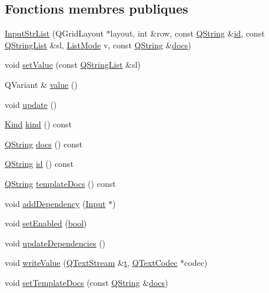 \subsection*{Fonctions membres publiques}
\begin{DoxyCompactItemize}
\item 
\hyperlink{class_input_str_list_a2ff2afcbcd50e8425f367f2888832564}{Input\+Str\+List} (Q\+Grid\+Layout $\ast$layout, int \&row, const \hyperlink{class_q_string}{Q\+String} \&\hyperlink{class_input_str_list_ac77454b074e83a217d1689c15aaa3aaa}{id}, const \hyperlink{class_q_string_list}{Q\+String\+List} \&sl, \hyperlink{class_input_str_list_a8f78ed184bdeaa050c24608ad4a05833}{List\+Mode} v, const \hyperlink{class_q_string}{Q\+String} \&\hyperlink{class_input_str_list_afc1f5afc3ad234b70a33143c092aee87}{docs})
\item 
void \hyperlink{class_input_str_list_a353a46afd90e0897ba6dce7a13d844d8}{set\+Value} (const \hyperlink{class_q_string_list}{Q\+String\+List} \&sl)
\item 
Q\+Variant \& \hyperlink{class_input_str_list_a60756f0f9f3fc4303a7c17550ae81a46}{value} ()
\item 
void \hyperlink{class_input_str_list_a29cf7f5d0f8aab6a573179f6ab9045da}{update} ()
\item 
\hyperlink{class_input_a4138334795f6330759839617744e20a9}{Kind} \hyperlink{class_input_str_list_a81c119323085a14b815ce58882bf34be}{kind} () const 
\item 
\hyperlink{class_q_string}{Q\+String} \hyperlink{class_input_str_list_afc1f5afc3ad234b70a33143c092aee87}{docs} () const 
\item 
\hyperlink{class_q_string}{Q\+String} \hyperlink{class_input_str_list_ac77454b074e83a217d1689c15aaa3aaa}{id} () const 
\item 
\hyperlink{class_q_string}{Q\+String} \hyperlink{class_input_str_list_a257bd03a73d42e765969082d9b0174a5}{template\+Docs} () const 
\item 
void \hyperlink{class_input_str_list_a226fe44b40476b696f03492b77c6ee3f}{add\+Dependency} (\hyperlink{class_input}{Input} $\ast$)
\item 
void \hyperlink{class_input_str_list_a79ba8c5252c084ff39301b7f5f5a6871}{set\+Enabled} (\hyperlink{qglobal_8h_a1062901a7428fdd9c7f180f5e01ea056}{bool})
\item 
void \hyperlink{class_input_str_list_aeca36d956357014a77036cddf1f48cb8}{update\+Dependencies} ()
\item 
void \hyperlink{class_input_str_list_a74b3b1b206990199513fa4d1c2c54143}{write\+Value} (\hyperlink{class_q_text_stream}{Q\+Text\+Stream} \&\hyperlink{058__bracket__recursion_8tcl_a69e959f6901827e4d8271aeaa5fba0fc}{t}, \hyperlink{class_q_text_codec}{Q\+Text\+Codec} $\ast$codec)
\item 
void \hyperlink{class_input_str_list_ab8098b108a58dd377d60eb904fdbf3c7}{set\+Template\+Docs} (const \hyperlink{class_q_string}{Q\+String} \&\hyperlink{class_input_str_list_afc1f5afc3ad234b70a33143c092aee87}{docs})
\end{DoxyCompactItemize}


